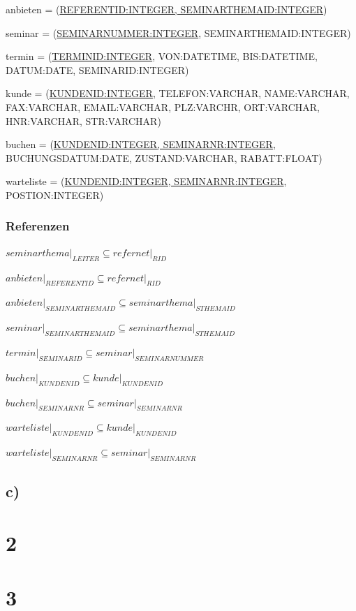 \documentclass[10pt,a4paper]{report}
\begin{document}
anbieten = (\underline{REFERENTID:INTEGER, SEMINARTHEMAID:INTEGER})

seminar = (\underline{SEMINARNUMMER:INTEGER}, SEMINARTHEMAID:INTEGER)

termin = (\underline{TERMINID:INTEGER}, VON:DATETIME, BIS:DATETIME, DATUM:DATE, SEMINARID:INTEGER)

kunde   = (\underline{KUNDENID:INTEGER}, TELEFON:VARCHAR, NAME:VARCHAR, FAX:VARCHAR, EMAIL:VARCHAR, PLZ:VARCHR, ORT:VARCHAR, HNR:VARCHAR, STR:VARCHAR)

buchen = (\underline{KUNDENID:INTEGER, SEMINARNR:INTEGER}, BUCHUNGSDATUM:DATE, ZUSTAND:VARCHAR, RABATT:FLOAT)

warteliste = (\underline{KUNDENID:INTEGER, SEMINARNR:INTEGER}, POSTION:INTEGER)

\subsubsection{Referenzen}
$seminarthema\vert_{LEITER} \subseteq refernet\vert_{RID}$

$anbieten\vert_{REFERENTID} \subseteq refernet\vert_{RID}$

$anbieten\vert_{SEMINARTHEMAID} \subseteq seminarthema\vert_{STHEMAID}$

$seminar\vert_{SEMINARTHEMAID} \subseteq seminarthema\vert_{STHEMAID}$

$termin\vert_{SEMINARID} \subseteq seminar\vert_{SEMINARNUMMER}$

$buchen\vert_{KUNDENID} \subseteq kunde\vert_{KUNDENID}$

$buchen\vert_{SEMINARNR} \subseteq seminar\vert_{SEMINARNR}$

$warteliste\vert_{KUNDENID} \subseteq kunde\vert_{KUNDENID}$

$warteliste\vert_{SEMINARNR} \subseteq seminar\vert_{SEMINARNR}$

\subsection{c)}



\section{2}


\section{3}

\end{document}
